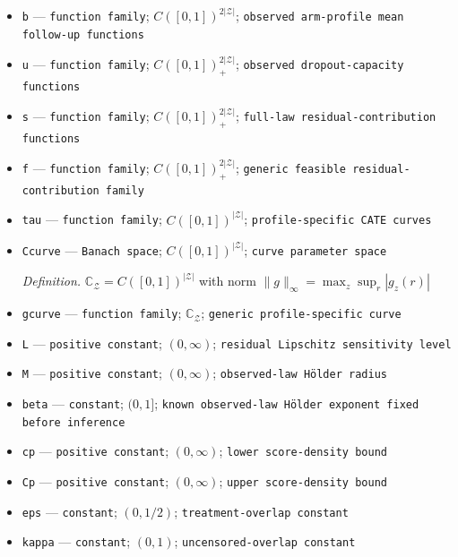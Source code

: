 \documentclass{article}
\begin{document}
\begin{itemize}
  \par\smallskip\noindent\emph{Definition.} \(\pi_a(x)=P_{\mathrm{obs}}(A=a\mid X=x)\)
  \item \texttt{b} --- \texttt{function family}; \(C([0,1])^{2|\mathcal Z|}\); \texttt{observed arm-\allowbreak{}profile mean follow-\allowbreak{}up functions}
  \item \texttt{u} --- \texttt{function family}; \(C([0,1])_+^{2|\mathcal Z|}\); \texttt{observed dropout-\allowbreak{}capacity functions}
  \item \texttt{s} --- \texttt{function family}; \(C([0,1])_+^{2|\mathcal Z|}\); \texttt{full-\allowbreak{}law residual-\allowbreak{}contribution functions}
  \item \texttt{f} --- \texttt{function family}; \(C([0,1])_+^{2|\mathcal Z|}\); \texttt{generic feasible residual-\allowbreak{}contribution family}
  \item \texttt{tau} --- \texttt{function family}; \(C([0,1])^{|\mathcal Z|}\); \texttt{profile-\allowbreak{}specific CATE curves}
  \item \texttt{Ccurve} --- \texttt{Banach space}; \(C([0,1])^{|\mathcal Z|}\); \texttt{curve parameter space}
  \par\smallskip\noindent\emph{Definition.} \(\mathbb C_{\mathcal Z}=C([0,1])^{|\mathcal Z|}\) with norm \(\|g\|_\infty=\max_z\sup_r|g_z(r)|\)
  \item \texttt{gcurve} --- \texttt{function family}; \(\mathbb C_{\mathcal Z}\); \texttt{generic profile-\allowbreak{}specific curve}
  \item \texttt{L} --- \texttt{positive constant}; \((0,\infty)\); \texttt{residual Lipschitz sensitivity level}
  \item \texttt{M} --- \texttt{positive constant}; \((0,\infty)\); \texttt{observed-\allowbreak{}law Hölder radius}
  \item \texttt{beta} --- \texttt{constant}; \((0,1]\); \texttt{known observed-\allowbreak{}law Hölder exponent fixed before inference}
  \item \texttt{cp} --- \texttt{positive constant}; \((0,\infty)\); \texttt{lower score-\allowbreak{}density bound}
  \item \texttt{Cp} --- \texttt{positive constant}; \((0,\infty)\); \texttt{upper score-\allowbreak{}density bound}
  \item \texttt{eps} --- \texttt{constant}; \((0,1/2)\); \texttt{treatment-\allowbreak{}overlap constant}
  \item \texttt{kappa} --- \texttt{constant}; \((0,1)\); \texttt{uncensored-\allowbreak{}overlap constant}

\end{itemize}
\end{document}
